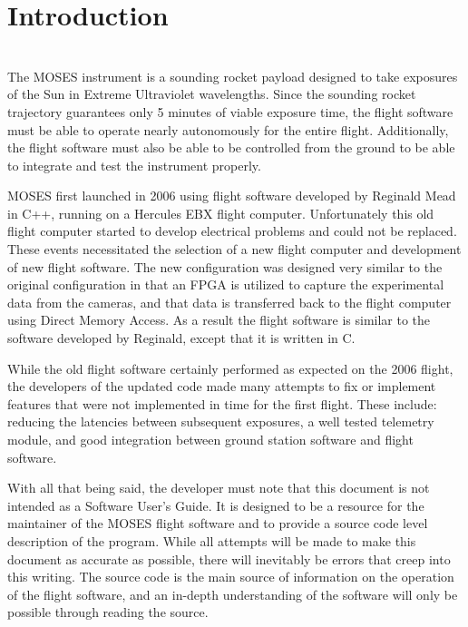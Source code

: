 \section{Introduction}
\hrulefill
\\
The MOSES instrument is a sounding rocket payload designed to take exposures of the Sun in Extreme Ultraviolet wavelengths. Since the sounding rocket trajectory guarantees only 5 minutes of viable exposure time, the flight software must be able to operate nearly autonomously for the entire flight. Additionally, the flight software must also be able to be controlled from the ground to be able to integrate and test the instrument properly.\par

MOSES first launched in 2006 using flight software developed by Reginald Mead in C++, running on a Hercules EBX flight computer. Unfortunately this old flight computer started to develop electrical problems and could not be replaced. These events necessitated the selection of a new flight computer and development of new flight software. The new configuration was designed very similar to the original configuration in that an FPGA is utilized to capture the experimental data from the cameras, and that data is transferred back to the flight computer using Direct Memory Access. As a result the flight software is similar to the software developed by Reginald, except that it is written in C. \par

While the old flight software certainly performed as expected on the 2006 flight, the developers of the updated code made many attempts to fix or implement features that were not implemented in time for the first flight. These include: reducing the latencies between subsequent exposures, a well tested telemetry module, and good integration between ground station software and flight software. \par

With all that being said, the developer must note that this document is not intended as a Software User's Guide. It is designed to be a resource for the maintainer of the MOSES flight software and to provide a source code level description of the program. While all attempts will be made to make this document as accurate as possible, there will inevitably be errors that creep into this writing. The source code is the main source of information on the operation of the flight software, and an in-depth understanding of the software will only be possible through reading the source.
